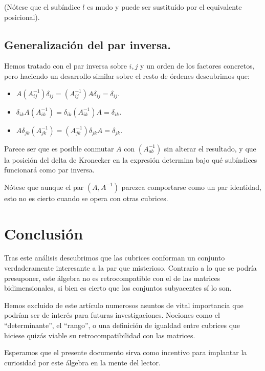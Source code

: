 \documentclass[a4paper, titlepage]{article}
\begin{document}
(Nótese que el subíndice $l$ es mudo y puede ser sustituído por el equivalente posicional).

\subsection{Generalización del par inversa.}

Hemos tratado con el par inversa sobre $i, j$ y un orden de los factores concretos, pero haciendo un desarrollo similar sobre el resto de órdenes descubrimos que:

\begin{itemize}
	\item $A(A_{ij}^{-1})\delta_{ij} = (A_{ij}^{-1})A\delta_{ij} = \delta_{ij}$.
	\item $\delta_{ik}A(A_{ik}^{-1}) = \delta_{ik}(A_{ik}^{-1})A = \delta_{ik}$.
	\item $A\delta_{jk}(A_{jk}^{-1}) = (A_{jk}^{-1})\delta_{jk}A = \delta_{jk}$.
\end{itemize}

Parece ser que es posible conmutar $A$ con $(A_{ab}^{-1})$ sin alterar el resultado, y que la posición del delta de Kronecker en la expresión determina bajo qué subíndices funcionará como par inversa.

Nótese que aunque el par $(A, A^{-1})$ parezca comportarse como un par identidad, esto no es cierto cuando se opera con otras cubrices.

\fi

\section{Conclusión}

Tras este análisis descubrimos que las cubrices conforman un conjunto verdaderamente interesante a la par que misterioso. Contrario a lo que se podría presuponer, este álgebra no es retrocompatible con el de las matrices bidimensionales, si bien es cierto que los conjuntos subyacentes sí lo son.

Hemos excluido de este artículo numerosos asuntos de vital importancia que podrían ser de interés para futuras investigaciones. Nociones como el ``determinante'', el ``rango'', o una definición de igualdad entre cubrices que hiciese quizás viable su retrocompatibilidad con las matrices.

Esperamos que el presente documento sirva como incentivo para implantar la curiosidad por este álgebra en la mente del lector.
\end{document}
